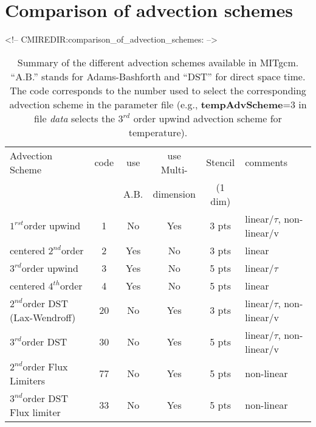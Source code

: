 \section{Comparison of advection schemes}
\label{sect:tracer_advection_schemes}
\begin{rawhtml}
<!-- CMIREDIR:comparison_of_advection_schemes: -->
\end{rawhtml}

\begin{table}[htb]
\centering
 \begin{tabular}[htb]{|l|c|c|c|c|l|}
   \hline
   Advection Scheme & code & use  & use Multi- & Stencil & comments \\
                    &      & A.B. & dimension & (1 dim) & \\
   \hline \hline
   $1^{rst}$order upwind  & 1 &  No & Yes & 3 pts & linear/$\tau$, non-linear/v\\
   \hline
   centered $2^{nd}$order & 2 &  Yes & No & 3 pts & linear \\
   \hline
   $3^{rd}$order upwind   & 3 &  Yes & No & 5 pts & linear/$\tau$\\
   \hline
   centered $4^{th}$order & 4 &  Yes & No & 5 pts & linear \\
   \hline \hline
   $2^{nd}$order DST (Lax-Wendroff)  & 20 &
                         No & Yes & 3 pts & linear/$\tau$, non-linear/v\\
   \hline
   $3^{rd}$order DST & 30 &  No & Yes & 5 pts & linear/$\tau$, non-linear/v\\
   \hline \hline
   $2^{nd}$order Flux Limiters & 77 &  No & Yes & 5 pts & non-linear \\
   \hline
   $3^{nd}$order DST Flux limiter & 33 &  No & Yes & 5 pts & non-linear \\
   \hline
 \end{tabular}
 \caption{Summary of the different advection schemes available in MITgcm.
          ``A.B.'' stands for Adams-Bashforth and ``DST'' for direct space time.
          The code corresponds to the number used to select the corresponding
          advection scheme in the parameter file (e.g., {\bf tempAdvScheme}=3 in
          file {\em data} selects the $3^{rd}$ order upwind advection scheme 
          for temperature).
   }
 \label{tab:advectionShemes_summary}
\end{table}


